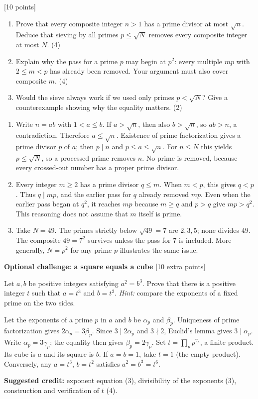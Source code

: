 \documentclass[11pt,letterpaper]{article}
\newcommand{\pts}[1]{\hfill\textcolor{muted}{\small[#1 points]}}
\newcommand{\partpts}[1]{\textcolor{muted}{\small(#1)}}
\newcounter{problem}
\newcommand{\problem}[2]{%
  \par\addvspace{11pt}\Needspace{6\baselineskip}%
  \stepcounter{problem}{\bfseries\color{navy}\theproblem.\ #1}\pts{#2}\par\nobreak}
\begin{document}
\ifsolutions\newpage\fi
\problem{Why the sieve works}{10}
\begin{enumerate}
  \item Prove that every composite integer $n>1$ has a prime divisor at
  most $\sqrt n$. Deduce that sieving by all primes $p\le\sqrt N$ removes
  every composite integer at most $N$. \partpts{4}
  \item Explain why the pass for a prime $p$ may begin at $p^2$:
  every multiple $mp$ with $2\le m<p$ has already been removed.
  Your argument must also cover composite $m$. \partpts{4}
  \item Would the sieve always work if we used only primes
  $p<\sqrt N$? Give a counterexample showing why the equality matters. \partpts{2}
\end{enumerate}
\begin{solution}
\begin{enumerate}
  \item Write $n=ab$ with $1<a\le b$. If $a>\sqrt n$, then also
  $b>\sqrt n$, so $ab>n$, a contradiction. Therefore $a\le\sqrt n$.
  Existence of prime factorization gives a prime divisor $p$ of $a$;
  then $p\mid n$ and $p\le a\le\sqrt n$. For $n\le N$ this yields
  $p\le\sqrt N$, so a processed prime removes $n$. No prime is removed,
  because every crossed-out number has a proper prime divisor.
  \item Every integer $m\ge2$ has a prime divisor $q\le m$.
  When $m<p$, this gives $q<p$. Thus $q\mid mp$, and the earlier
  pass for $q$ already removed $mp$. Even when the earlier pass began
  at $q^2$, it reaches $mp$ because $m\ge q$ and $p>q$ give
  $mp>q^2$. This reasoning does not assume that $m$ itself is prime.
  \item Take $N=49$. The primes strictly below $\sqrt{49}=7$ are
  $2,3,5$; none divides $49$. The composite $49=7^2$ survives unless
  the pass for $7$ is included. More generally, $N=p^2$ for any prime
  $p$ illustrates the same issue.
\end{enumerate}
\end{solution}

\par\addvspace{12pt}
{\bfseries\color{teal}Optional challenge: a square equals a cube}
\pts{10 extra}

Let $a,b$ be positive integers satisfying $a^2=b^3$. Prove that there is a
positive integer $t$ such that $a=t^3$ and $b=t^2$.
\emph{Hint:} compare the exponents of a fixed prime on the two sides.
\begin{solution}
Let the exponents of a prime $p$ in $a$ and $b$ be $\alpha_p$ and
$\beta_p$. Uniqueness of prime factorization gives
$2\alpha_p=3\beta_p$. Since $3\mid2\alpha_p$ and $3\nmid2$,
Euclid's lemma gives $3\mid\alpha_p$. Write $\alpha_p=3\gamma_p$;
the equality then gives $\beta_p=2\gamma_p$.
Set $t=\prod_p p^{\gamma_p}$, a finite product. Its cube is $a$ and its
square is $b$. If $a=b=1$, take $t=1$ (the empty product).
Conversely, any $a=t^3$, $b=t^2$ satisfies $a^2=b^3=t^6$.

\textbf{Suggested credit:} exponent equation (3), divisibility of the
exponents (3), construction and verification of $t$ (4).
\end{solution}
\end{document}
